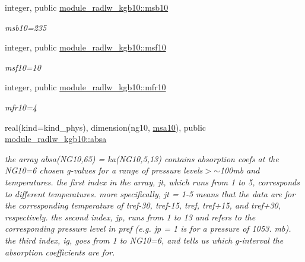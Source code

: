 \begin{DoxyCompactItemize}
\mbox{\label{group__module__radlw__kgbnn_gaf33570d793ca152588c14ce30ac30798}} 
integer, public \hyperlink{group__module__radlw__kgbnn_gaf33570d793ca152588c14ce30ac30798}{module\+\_\+radlw\+\_\+kgb10\+::msb10}
\begin{DoxyCompactList}\small\item\em msb10=235 \end{DoxyCompactList}\item 
\mbox{\label{group__module__radlw__kgbnn_ga1b69c6fe99ed4ebc7b3d78b8f842b880}} 
integer, public \hyperlink{group__module__radlw__kgbnn_ga1b69c6fe99ed4ebc7b3d78b8f842b880}{module\+\_\+radlw\+\_\+kgb10\+::msf10}
\begin{DoxyCompactList}\small\item\em msf10=10 \end{DoxyCompactList}\item 
\mbox{\label{group__module__radlw__kgbnn_ga0f3944c4b86044e0c5db3dc351226c88}} 
integer, public \hyperlink{group__module__radlw__kgbnn_ga0f3944c4b86044e0c5db3dc351226c88}{module\+\_\+radlw\+\_\+kgb10\+::mfr10}
\begin{DoxyCompactList}\small\item\em mfr10=4 \end{DoxyCompactList}\item 
\mbox{\label{group__module__radlw__kgbnn_ga14f18538f77c1a3d651e36acf90baa19}} 
real(kind=kind\+\_\+phys), dimension(ng10, \hyperlink{namespacemodule__radlw__kgb10_a2305b922082d1cc367276b636f09fb6c}{msa10}), public \hyperlink{group__module__radlw__kgbnn_ga14f18538f77c1a3d651e36acf90baa19}{module\+\_\+radlw\+\_\+kgb10\+::absa}
\begin{DoxyCompactList}\small\item\em the array absa(\+N\+G10,65) = ka(\+N\+G10,5,13) contains absorption coefs at the N\+G10=6 chosen g-\/values for a range of pressure levels$>$$\sim$100mb and temperatures. the first index in the array, jt, which runs from 1 to 5, corresponds to different temperatures. more specifically, jt = 1-\/5 means that the data are for the corresponding temperature of tref-\/30, tref-\/15, tref, tref+15, and tref+30, respectively. the second index, jp, runs from 1 to 13 and refers to the corresponding pressure level in pref (e.\+g. jp = 1 is for a pressure of 1053. mb). the third index, ig, goes from 1 to N\+G10=6, and tells us which g-\/interval the absorption coefficients are for. \end{DoxyCompactList}\item 

\end{DoxyCompactItemize}
